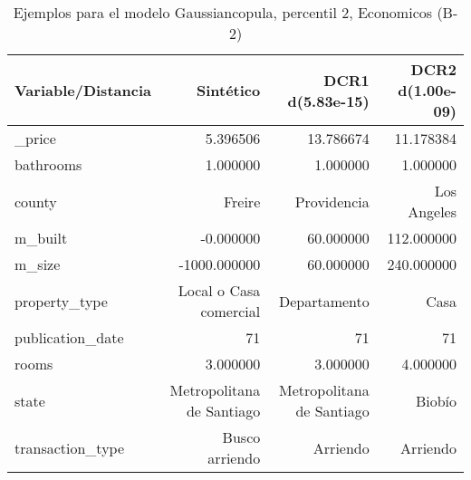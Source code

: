 \begin{table}[H]
\centering
\fontsize{10}{14}\selectfont
\caption{Ejemplos para el modelo Gaussiancopula, percentil 2, Economicos (B-2)}
\label{table-example-economicos-b-2-gaussiancopula-2p}
\begin{tabular}{|l|r|r|r|}
\hline
\rowcolor[gray]{0.8}
Variable/Distancia & Sintético & DCR1 d(5.83e-15) & DCR2 d(1.00e-09) \\
\hline \_price & \cellcolor[rgb]{0.9, 0.54, 0.52} 5.396506 & 13.786674 & 11.178384 \\
\hline bathrooms & \cellcolor[rgb]{0.9, 0.54, 0.52} 1.000000 & \cellcolor[rgb]{0.9, 0.54, 0.52} 1.000000 & \cellcolor[rgb]{0.9, 0.54, 0.52} 1.000000 \\
\hline county & \cellcolor[rgb]{0.9, 0.54, 0.52} Freire & Providencia & Los Angeles \\
\hline m\_built & \cellcolor[rgb]{0.9, 0.54, 0.52} -0.000000 & 60.000000 & 112.000000 \\
\hline m\_size & \cellcolor[rgb]{0.9, 0.54, 0.52} -1000.000000 & 60.000000 & 240.000000 \\
\hline property\_type & \cellcolor[rgb]{0.9, 0.54, 0.52} Local o Casa comercial & Departamento & Casa \\
\hline publication\_date & \cellcolor[rgb]{0.9, 0.54, 0.52} 71 & \cellcolor[rgb]{0.9, 0.54, 0.52} 71 & \cellcolor[rgb]{0.9, 0.54, 0.52} 71 \\
\hline rooms & \cellcolor[rgb]{0.9, 0.54, 0.52} 3.000000 & \cellcolor[rgb]{0.9, 0.54, 0.52} 3.000000 & 4.000000 \\
\hline state & \cellcolor[rgb]{0.9, 0.54, 0.52} Metropolitana de Santiago & \cellcolor[rgb]{0.9, 0.54, 0.52} Metropolitana de Santiago & Biobío \\
\hline transaction\_type & \cellcolor[rgb]{0.9, 0.54, 0.52} Busco arriendo & Arriendo & Arriendo \\
\hline
\end{tabular}
\end{table}
